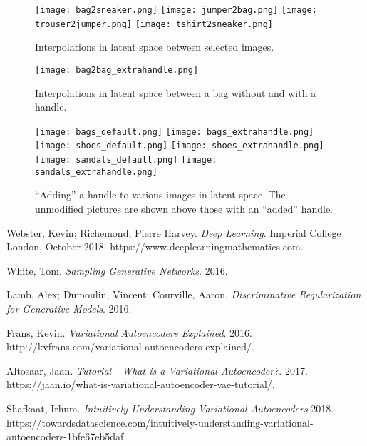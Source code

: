 \documentclass[]{article}
\begin{document}
\begin{figure}
  \centering
  \texttt{[image: bag2sneaker.png]}
  \texttt{[image: jumper2bag.png]}
  \texttt{[image: trouser2jumper.png]}
  \texttt{[image: tshirt2sneaker.png]}
  \caption{Interpolations in latent space between selected images.}
  \label{fig:interpolations}
\end{figure}

\begin{figure}
  \centering
  \texttt{[image: bag2bag\_extrahandle.png]}
  \caption{Interpolations in latent space between a bag without and with a handle.}
  \label{fig:interpolation_handle}
\end{figure}

\begin{figure}
  \centering
  \texttt{[image: bags\_default.png]}
  \texttt{[image: bags\_extrahandle.png]}
  \texttt{[image: shoes\_default.png]}
  \texttt{[image: shoes\_extrahandle.png]}
  \texttt{[image: sandals\_default.png]}
  \texttt{[image: sandals\_extrahandle.png]}
  \caption{``Adding'' a handle to various images in latent space. The unmodified pictures are shown above those with an ``added'' handle.}
  \label{fig:extrahandles}
\end{figure}







	





\begin{thebibliography}{9}
          
  Webster, Kevin; Richemond, Pierre Harvey.
  \textit{Deep Learning}.
  Imperial College London, October 2018.
  https://www.deeplearningmathematics.com.

  White, Tom.
  \textit{Sampling Generative Networks}.
  2016.
  
  Lamb, Alex; Dumoulin, Vincent; Courville, Aaron.
  \textit{Discriminative Regularization for Generative Models}.
  2016.

  Frans, Kevin.
  \textit{Variational Autoencoders Explained}.
  2016.
  http://kvfrans.com/variational-autoencoders-explained/.

  Altosaar, Jaan.
  \textit{Tutorial - What is a Variational Autoencoder?}.
  2017.
  https://jaan.io/what-is-variational-autoencoder-vae-tutorial/.

  Shafkaat, Irhum.
  \textit{Intuitively Understanding Variational Autoencoders}
  2018.
  https://towardsdatascience.com/intuitively-understanding-variational-autoencoders-1bfe67eb5daf
  
  
\end{thebibliography}
\end{document}
